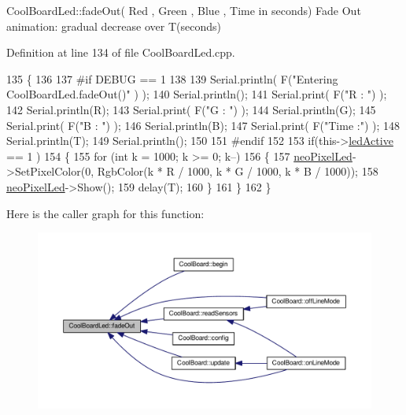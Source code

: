Cool\+Board\+Led\+::fade\+Out( Red , Green , Blue , Time in seconds) Fade Out animation\+: gradual decrease over T(seconds) 

Definition at line 134 of file Cool\+Board\+Led.\+cpp.


\begin{DoxyCode}
135 \{
136 
137 \textcolor{preprocessor}{#if DEBUG == 1 }
138 
139     Serial.println( F(\textcolor{stringliteral}{"Entering CoolBoardLed.fadeOut()"} ) );
140     Serial.println();
141     Serial.print( F(\textcolor{stringliteral}{"R : "}) );
142     Serial.println(R);
143     Serial.print( F(\textcolor{stringliteral}{"G : "}) );
144     Serial.println(G);
145     Serial.print( F(\textcolor{stringliteral}{"B : "}) );
146     Serial.println(B);
147     Serial.print( F(\textcolor{stringliteral}{"Time :"}) );
148     Serial.println(T);
149     Serial.println();
150 
151 \textcolor{preprocessor}{#endif  }
152 
153     \textcolor{keywordflow}{if}(this->\hyperlink{class_cool_board_led_aadd04d2ecf123247718d77f42fba7f08}{ledActive} == 1 )
154     \{
155         \textcolor{keywordflow}{for} (\textcolor{keywordtype}{int} k = 1000; k >= 0; k--) 
156         \{
157             \hyperlink{class_cool_board_led_ac2c13fa462a010cd9242bf297c013923}{neoPixelLed}->SetPixelColor(0, RgbColor(k * R / 1000, k * G / 1000, k * B / 1000));
158             \hyperlink{class_cool_board_led_ac2c13fa462a010cd9242bf297c013923}{neoPixelLed}->Show();
159             delay(T);
160         \}
161     \}
162 \}
\end{DoxyCode}
Here is the caller graph for this function\+:\nopagebreak
\begin{figure}[H]
\begin{center}
\leavevmode
\includegraphics[width=350pt]{de/dc0/class_cool_board_led_a93d545679237e8cc858324367149775c_icgraph}
\end{center}
\end{figure}
\mbox{\label{class_cool_board_led_a8ed3053a36f0ed4a131f43b5b17efb61}} 
